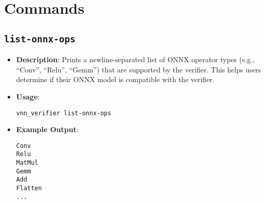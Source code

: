 \section{Commands}

\subsection{\texttt{list-onnx-ops}}
\begin{itemize}
    \item \textbf{Description}: Prints a newline-separated list of ONNX operator types (e.g., ``Conv'', ``Relu'', ``Gemm'') that are supported by the verifier. 
	This helps users determine if their ONNX model is compatible with the verifier.
    \item \textbf{Usage}:
    \begin{lstlisting}[style=bash]
vnn_verifier list-onnx-ops \end{lstlisting}
    \item \textbf{Example Output}:
    \begin{lstlisting}[style=bash, numbers=none, frame=none, backgroundcolor=\color{white}]
Conv
Relu
MatMul
Gemm
Add
Flatten
...
    \end{lstlisting}
\end{itemize}

